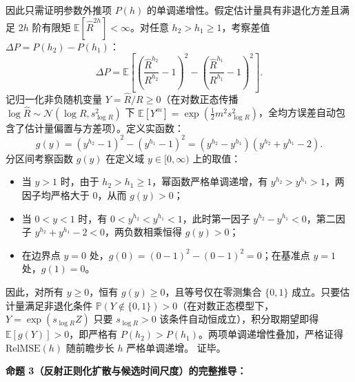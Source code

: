 \documentclass[11pt,a4paper]{article}
\theoremstyle{plain}
\theoremstyle{definition}
\begin{document}
因此只需证明参数外推项 $P(h)$ 的单调递增性。假定估计量具有非退化方差且满足 $2h$ 阶有限矩 $\mathbb{E}[\hat{R}^{2h}] < \infty$。对任意 $h_2 > h_1 \ge 1$，考察差值 $\Delta P = P(h_2) - P(h_1)$：
\begin{equation}
\Delta P = \mathbb{E}\left[ \left(\frac{\hat{R}^{h_2}}{R^{h_2}} - 1\right)^2 - \left(\frac{\hat{R}^{h_1}}{R^{h_1}} - 1\right)^2 \right].
\end{equation}
记归一化非负随机变量 $Y = \hat{R}/R \ge 0$（在对数正态传播 $\log\hat{R}\sim\mathcal{N}(\log R, s_{\log R}^2)$ 下 $\mathbb{E}[Y^m]=\exp(\tfrac{1}{2}m^2 s_{\log R}^2)$，全均方误差自动包含了估计量偏置与方差项）。定义实函数：
\begin{equation}
g(y) = (y^{h_2} - 1)^2 - (y^{h_1} - 1)^2 = (y^{h_2} - y^{h_1})(y^{h_2} + y^{h_1} - 2).
\end{equation}
分区间考察函数 $g(y)$ 在定义域 $y \in [0, \infty)$ 上的取值：
\begin{itemize}
\item 当 $y > 1$ 时，由于 $h_2 > h_1 \ge 1$，幂函数严格单调递增，有 $y^{h_2} > y^{h_1} > 1$，两因子均严格大于 0，从而 $g(y) > 0$；
\item 当 $0 < y < 1$ 时，有 $0 < y^{h_2} < y^{h_1} < 1$，此时第一因子 $y^{h_2} - y^{h_1} < 0$，第二因子 $y^{h_2} + y^{h_1} - 2 < 0$，两负数相乘恒得 $g(y) > 0$；
\item 在边界点 $y = 0$ 处，$g(0) = (0-1)^2 - (0-1)^2 = 0$；在基准点 $y = 1$ 处，$g(1) = 0$。
\end{itemize}
因此，对所有 $y \ge 0$，恒有 $g(y) \ge 0$，且等号仅在零测集合 $\{0, 1\}$ 成立。只要估计量满足非退化条件 $\mathbb{P}(Y \notin \{0, 1\}) > 0$（在对数正态模型下，$Y = \exp(s_{\log R} Z)$ 只要 $s_{\log R} > 0$ 该条件自动恒成立），积分取期望即得 $\mathbb{E}[g(Y)] > 0$，即严格有 $P(h_2) > P(h_1)$。两项单调递增性叠加，严格证得 $\text{RelMSE}(h)$ 随前瞻步长 $h$ 严格单调递增。
证毕。

\vspace{0.8em}
\noindent\textbf{命题 3（反射正则化扩散与候选时间尺度）的完整推导：}
\end{document}

